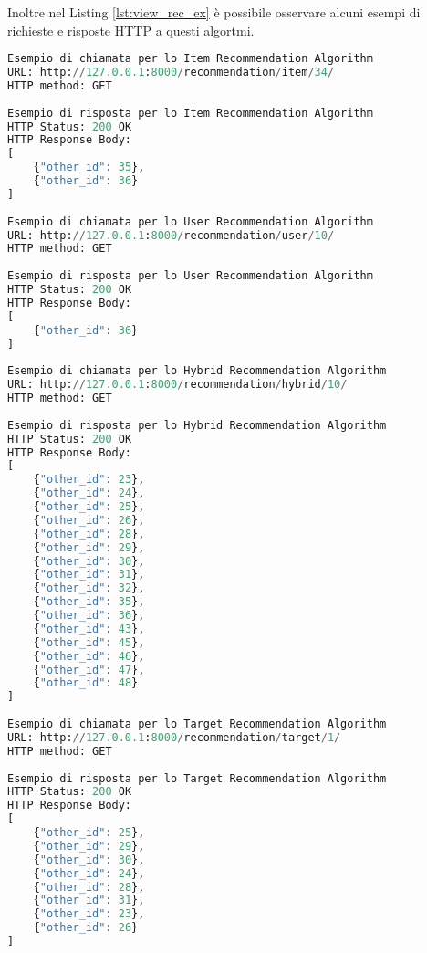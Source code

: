 Inoltre nel Listing \ref{lst:view_rec_ex} è possibile osservare alcuni esempi di richieste e risposte HTTP a questi algortmi.
\lstset{style=python_code_style}
\begin{lstlisting}[language=Python, label=lst:view_rec_ex, caption={Esempi di chiamate e risposte HTTP per i diversi algoritmi di raccomandazione.}]
Esempio di chiamata per lo Item Recommendation Algorithm
URL: http://127.0.0.1:8000/recommendation/item/34/ 
HTTP method: GET
 
Esempio di risposta per lo Item Recommendation Algorithm
HTTP Status: 200 OK
HTTP Response Body:
[
    {"other_id": 35},
    {"other_id": 36}
]
 
Esempio di chiamata per lo User Recommendation Algorithm
URL: http://127.0.0.1:8000/recommendation/user/10/ 
HTTP method: GET
 
Esempio di risposta per lo User Recommendation Algorithm
HTTP Status: 200 OK
HTTP Response Body:
[
    {"other_id": 36}
]
 
Esempio di chiamata per lo Hybrid Recommendation Algorithm
URL: http://127.0.0.1:8000/recommendation/hybrid/10/ 
HTTP method: GET
 
Esempio di risposta per lo Hybrid Recommendation Algorithm
HTTP Status: 200 OK
HTTP Response Body:
[
    {"other_id": 23},
    {"other_id": 24},
    {"other_id": 25},
    {"other_id": 26},
    {"other_id": 28},
    {"other_id": 29},
    {"other_id": 30},
    {"other_id": 31},
    {"other_id": 32},
    {"other_id": 35},
    {"other_id": 36},
    {"other_id": 43},
    {"other_id": 45},
    {"other_id": 46},
    {"other_id": 47},
    {"other_id": 48}
]
 
Esempio di chiamata per lo Target Recommendation Algorithm
URL: http://127.0.0.1:8000/recommendation/target/1/ 
HTTP method: GET
 
Esempio di risposta per lo Target Recommendation Algorithm
HTTP Status: 200 OK
HTTP Response Body:
[
    {"other_id": 25},
    {"other_id": 29},
    {"other_id": 30},
    {"other_id": 24},
    {"other_id": 28},
    {"other_id": 31},
    {"other_id": 23},
    {"other_id": 26}
]
\end{lstlisting}
%
